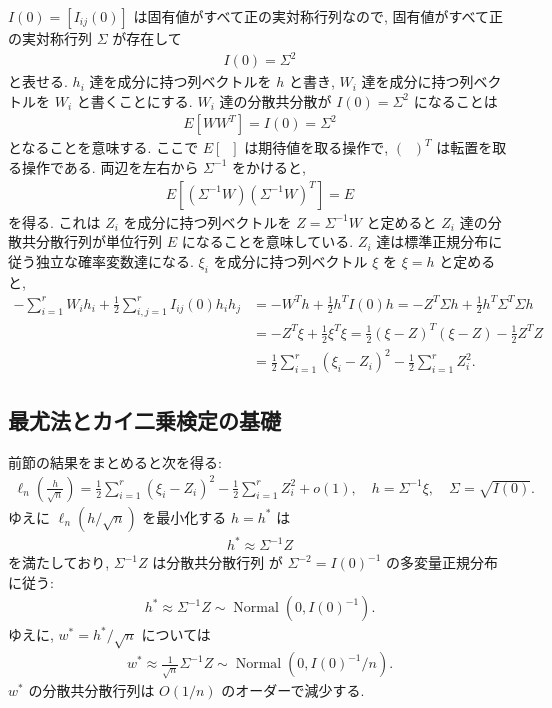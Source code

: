 \documentclass[12pt,twoside]{jarticle}
\theoremstyle{jplain}
\theoremstyle{jplain}
\theoremstyle{jplain}
\numberwithin{theorem}{section}
\numberwithin{equation}{section}
\numberwithin{figure}{section}
\numberwithin{table}{section}
\begin{document}
$I(0)=[I_{ij}(0)]$ は固有値がすべて正の実対称行列なので,
固有値がすべて正の実対称行列 $\Sigma$ が存在して
\begin{align*}
  I(0) = \Sigma^2
\end{align*}
と表せる. $h_i$ 達を成分に持つ列ベクトルを $h$ と書き,
$W_i$ 達を成分に持つ列ベクトルを $W_i$ と書くことにする.
$W_i$ 達の分散共分散が $I(0)=\Sigma^2$ になることは
\begin{align*}
  E[WW^T] = I(0) = \Sigma^2
\end{align*}
となることを意味する.
ここで $E[\;\;]$ は期待値を取る操作で, $(\;\;)^T$ は転置を取る操作である.
両辺を左右から $\Sigma^{-1}$ をかけると,
\begin{align*}
  E[(\Sigma^{-1}W)(\Sigma^{-1}W)^T] = E
\end{align*}
を得る. これは $Z_i$ を成分に持つ列ベクトルを $Z=\Sigma^{-1}W$ と定めると
$Z_i$ 達の分散共分散行列が単位行列 $E$ になることを意味している.
$Z_i$ 達は標準正規分布に従う独立な確率変数達になる.
$\xi_i$ を成分に持つ列ベクトル $\xi$ を $\xi= h$ と定めると,
\begin{align*}
  -\sum_{i=1}^r W_i h_i
  + \frac{1}{2}\sum_{i,j=1}^r I_{ij}(0) h_i h_j
  &
  = - W^T h + \frac{1}{2} h^T I(0) h
  = - Z^T\Sigma h + \frac{1}{2} h^T\Sigma^T\Sigma h
  \\ &
  = - Z^T\xi + \frac{1}{2}\xi^T\xi
  = \frac{1}{2}(\xi-Z)^T(\xi-Z) - \frac{1}{2}Z^T Z
  \\ &
  = \frac{1}{2}\sum_{i=1}^r (\xi_i-Z_i)^2
  - \frac{1}{2}\sum_{i=1}^r Z_i^2.
\end{align*}

\subsection{最尤法とカイ二乗検定の基礎}

前節の結果をまとめると次を得る:
\begin{align*}
  \ell_n\left(\frac{h}{\sqrt{n}}\right)
  = \frac{1}{2}\sum_{i=1}^r (\xi_i-Z_i)^2
  - \frac{1}{2}\sum_{i=1}^r Z_i^2
  +o(1),
  \quad
  h = \Sigma^{-1}\xi, \quad
  \Sigma = \sqrt{I(0)}.
\end{align*}
ゆえに $\ell_n(h/\sqrt{n})$ を最小化する $h=h^*$ は
\begin{align*}
  h^* \approx \Sigma^{-1} Z
\end{align*}
を満たしており, $\Sigma^{-1} Z$ は分散共分散行列
が $\Sigma^{-2} = I(0)^{-1}$ の多変量正規分布に従う:
\begin{align*}
  h^*
  \approx \Sigma^{-1}Z
  \sim \operatorname{Normal}(0,I(0)^{-1}).
\end{align*}
ゆえに, $w^*=h^*/\sqrt{n}$ については
\begin{align*}
  w^*
  \approx \frac{1}{\sqrt{n}}\Sigma^{-1}Z
  \sim \operatorname{Normal}(0, I(0)^{-1}/n).
\end{align*}
$w^*$ の分散共分散行列は $O(1/n)$ のオーダーで減少する.
\end{document}
